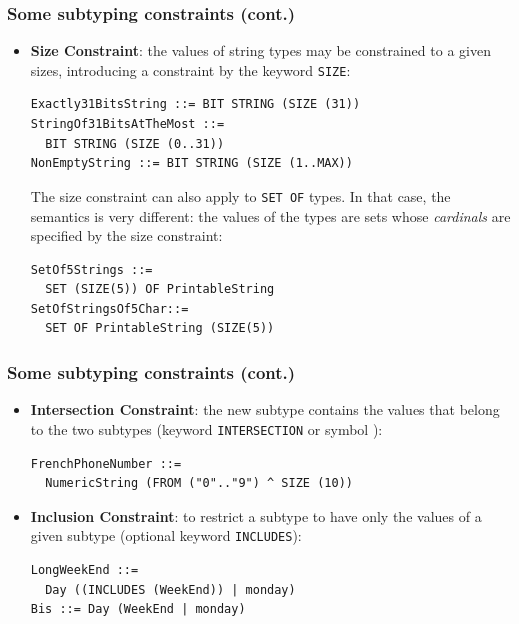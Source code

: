 \documentclass[compress,dvips,xcolor={dvipsnames},t]{beamer}
\begin{document}
\begin{frame}[containsverbatim]
\frametitle{Some subtyping constraints (cont.)}

\begin{itemize}

  \item \textbf{Size Constraint}: the values of string types may be
        constrained to a given sizes, introducing a constraint by the
        keyword \texttt{SIZE}:

\begin{verbatim}
Exactly31BitsString ::= BIT STRING (SIZE (31))
StringOf31BitsAtTheMost ::=
  BIT STRING (SIZE (0..31))
NonEmptyString ::= BIT STRING (SIZE (1..MAX))
\end{verbatim}

The size constraint can also apply to \texttt{SET OF} types. In that
case, the semantics is very different: the values of the types are
sets whose \emph{cardinals} are specified by the size constraint:

\begin{verbatim}
SetOf5Strings ::=
  SET (SIZE(5)) OF PrintableString
SetOfStringsOf5Char::=
  SET OF PrintableString (SIZE(5))
\end{verbatim}

\end{itemize}

\end{frame}

\begin{frame}[containsverbatim]
\frametitle{Some subtyping constraints (cont.)}

\begin{itemize}

  \item \textbf{Intersection Constraint}: the new subtype contains the
        values that belong to the two subtypes (keyword
        \texttt{INTERSECTION} or symbol \texttt{}):

\begin{verbatim}
FrenchPhoneNumber ::=
  NumericString (FROM ("0".."9") ^ SIZE (10))
\end{verbatim}

  \item \textbf{Inclusion Constraint}: to restrict a subtype to have
        only the values of a given subtype (optional keyword
        \texttt{INCLUDES}):

\begin{verbatim}
LongWeekEnd ::=
  Day ((INCLUDES (WeekEnd)) | monday)
Bis ::= Day (WeekEnd | monday)
\end{verbatim}
\end{itemize}

\end{frame}
\end{document}
